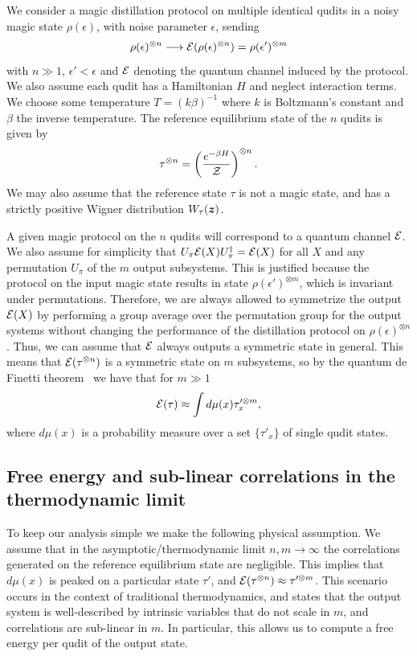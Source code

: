 \documentclass[pra,
aps,
twocolumn,
superscriptaddress,
groupedaddress,
nofootinbib,
reprint
]{revtex4-1}
\begin{document}
We consider a magic distillation protocol on multiple identical qudits in a noisy magic state $\rho(\epsilon)$, with noise parameter $\epsilon$, sending 
\begin{equation}
\rho(\epsilon)^{\otimes n} \longrightarrow {\mathcal E}(\rho(\epsilon)^{\otimes n}) =\rho(\epsilon')^{\otimes m}
\end{equation}
with $n \gg 1$, $\epsilon' <\epsilon$ and ${\mathcal E}$ denoting the quantum channel induced by the protocol. We also assume each qudit has a Hamiltonian $H$ and neglect interaction terms. We choose some temperature $T = (k\beta)^{-1}$ where $k$ is Boltzmann's constant and $\beta$ the inverse temperature. The reference equilibrium state of the $n$ qudits is given by
\begin{equation}
\tau^{\otimes n} = \left ( \frac{e^{-\beta H}}{\mathcal{Z}} \right )  ^{\otimes n}.
\end{equation}
We may also assume that the reference state $\tau$ is not a magic state, and has a strictly positive Wigner distribution $W_\tau(\bm{z})$.

A given magic protocol on the $n$ qudits will correspond to a quantum channel ${\mathcal E}$. We also assume for simplicity that $U_\pi{\mathcal E}(X) U_\pi^\dagger = {\mathcal E}(X)$ for all $X$ and any permutation $U_\pi$ of the $m$ output subsystems. This is justified because the protocol on the input magic state results in state $\rho(\epsilon')^{\otimes m}$, which is invariant under permutations. Therefore, we are always allowed to symmetrize the output ${\mathcal E}(X)$ by performing a group average over the permutation group for the output systems without changing the performance of the distillation protocol on $\rho(\epsilon)^{\otimes n}$. Thus, we can assume that ${\mathcal E}$ always outputs a symmetric state in general. This means that ${\mathcal E}(\tau^{\otimes n})$ is a symmetric state on $m$ subsystems, so by the quantum de Finetti theorem~\cite{hudson_locally_1976, christandl_2007} we have that for $m \gg 1$
\begin{equation}
{\mathcal E}(\tau) \approx \int d\mu(x) \tau_x^{\prime \otimes m},
\end{equation}
where $d\mu(x)$ is a probability measure over a set $\{\tau'_x\}$ of single qudit states.

\subsection{Free energy and sub-linear correlations in the thermodynamic limit}
To keep our analysis simple we make the following physical assumption. We assume that in the asymptotic/thermodynamic limit $n,m \rightarrow \infty$ the correlations generated on the reference equilibrium state are negligible. This implies that $d\mu(x)$ is peaked on a particular state $\tau'$, and ${\mathcal E}(\tau^{\otimes n}) \approx \tau'^{\otimes m}$. This scenario occurs in the context of traditional thermodynamics, and states that the output system is well-described by intrinsic variables that do not scale in $m$, and correlations are sub-linear in $m$. In particular, this allows us to compute a free energy per qudit of the output state. 
\end{document}
